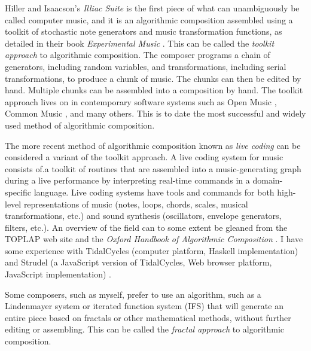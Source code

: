 \documentclass[11pt]{scrartcl}
\begin{document}
Hiller and Isaacson's \emph{Illiac Suite} \parencite{illiacsuite} is the first piece of what can unambiguously be called computer music, and it is an algorithmic composition assembled using a toolkit of stochastic note generators and music transformation functions, as detailed in their book \emph{Experimental Music} \parencite{hiller}. This can be called the \emph{toolkit approach} to algorithmic composition. The composer programs a chain of generators, including random variables, and transformations, including serial transformations, to produce a chunk of music. The chunks can then be edited by hand. Multiple chunks can be assembled into a composition by hand. The toolkit approach lives on in contemporary software systems such as Open Music \parencite{OpenMusic}, Common Music \parencite{CommonMusic, musx}, and many others. This is to date the most successful and widely used method of algorithmic composition.

The more recent method of algorithmic composition known as \emph{live coding} can be considered a variant of the toolkit approach. A live coding system for music consists of.a toolkit of routines that are assembled into a music-generating graph during a live performance by interpreting real-time commands in a domain-specific language. Live coding systems have tools and commands for both high-level representations of music (notes, loops, chords, scales, musical transformations, etc.) and sound synthesis (oscillators, envelope generators, filters, etc.). An overview of the field can to some extent be gleaned from the TOPLAP web site \parencite{toplap} and the \emph{Oxford Handbook of Algorithmic Composition} \parencite{mclean2018oxford}. I have some experience with TidalCycles (computer platform, Haskell implementation) \parencite{tidalcycles} and Strudel (a JavaScript version of TidalCycles, Web browser platform, JavaScript implementation) \parencite{strudel}.

Some composers, such as myself, prefer to use an algorithm, such as a Lindenmayer system \parencite{algorithmicbeautyofplants, prusinkiewicz1986sgs,  fractalmusicwithstringrewritinggrammars} or iterated function system (IFS) \parencite{fractalseverywhere, ifsmusic} that will generate an entire piece based on fractals or other mathematical methods, without further editing or assembling. This can be called the \emph{fractal approach} to algorithmic composition.
\end{document}
